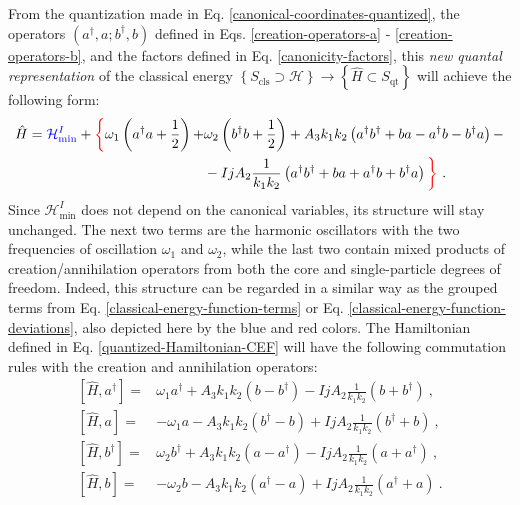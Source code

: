 From the quantization made in Eq. \ref{canonical-coordinates-quantized}, the operators $(a^\dagger,a;b^\dagger,b)$ defined in Eqs. \ref{creation-operators-a} - \ref{creation-operators-b}, and the factors defined in Eq. \ref{canonicity-factors}, this \emph{new quantal representation} of the classical energy $\left\{S_\text{cls}\supset\mathcal{H}\right\}\to\left\{\hat{H}\subset S_\text{qt}\right\}$ will achieve the following form:
\begin{align}
    \hat{H}={\color{blue}\mathcal{H}_\text{min}^I}+{\color{red}\bigg\{}\omega_1\left(a^\dagger a+\frac{1}{2}\right)+&\omega_2\left(b^\dagger b+\frac{1}{2}\right)+A_3k_1k_2\left(a^\dagger b^\dagger+ba-a^\dagger b-b^\dagger a\right)-\nonumber\\
                                                                                &-IjA_2\frac{1}{k_1k_2}\left(a^\dagger b^\dagger + ba + a^\dagger b + b^\dagger a \right){\color{red}\bigg\}}\ .
    \label{quantized-Hamiltonian-CEF}
\end{align}
Since $\mathcal{H}_\text{min}^I$ does not depend on the canonical variables, its structure will stay unchanged. The next two terms are the harmonic oscillators with the two frequencies of oscillation $\omega_1$ and $\omega_2$, while the last two contain mixed products of creation/annihilation operators from both the core and single-particle degrees of freedom. Indeed, this structure can be regarded in a similar way as the grouped terms from Eq. \ref{classical-energy-function-terms} or Eq. \ref{classical-energy-function-deviations}, also depicted here by the blue and red colors. The Hamiltonian defined in Eq. \ref{quantized-Hamiltonian-CEF} will have the following commutation rules with the creation and annihilation operators:
\begin{align}
    \left[\hat{H},a^\dagger\right]=&\omega_1a^\dagger+A_3k_1k_2(b-b^\dagger)-IjA_2\frac{1}{k_1k_2}(b+b^\dagger)\ ,\nonumber\\
    \left[\hat{H},a\right]=&-\omega_1a-A_3k_1k_2(b^\dagger-b)+IjA_2\frac{1}{k_1k_2}(b^\dagger+b)\ ,\nonumber\\
    \left[\hat{H},b^\dagger\right]=&\omega_2b^\dagger+A_3k_1k_2\left(a-a^\dagger\right)-IjA_2\frac{1}{k_1k_2}\left(a+a^\dagger\right)\ ,\nonumber\\
    \left[\hat{H},b\right]=&-\omega_2b-A_3k_1k_2\left(a^\dagger-a\right)+IjA_2\frac{1}{k_1k_2}\left(a^\dagger+a\right)\ .
    \label{H-quantal-linear-system-a-b-operators}
\end{align}

